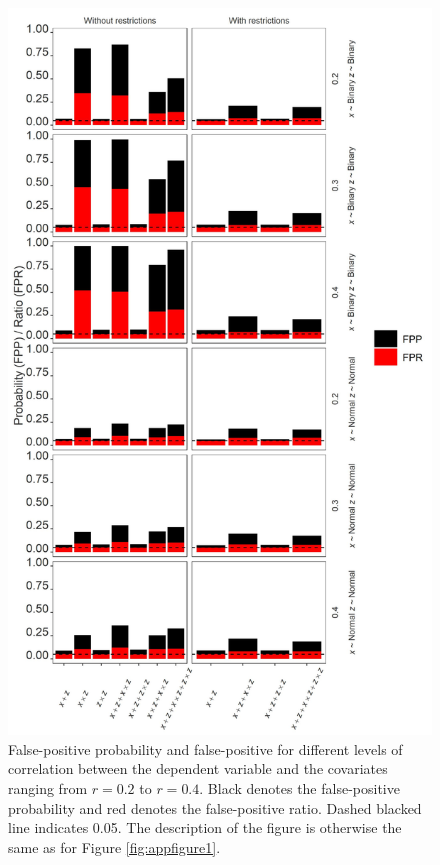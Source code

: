 \begin{landscape}
\begin{figure}[ht!]
\includegraphics[scale=0.65]{R/Analysis/Result/Figures/Figure2SI.jpeg}
\centering
\caption{False-positive probability and false-positive for different levels of correlation between the dependent variable and the covariates ranging from  $\textit{r}=0.2$ to  $\textit{r}=0.4$. Black denotes the false-positive probability and red denotes the false-positive ratio. Dashed blacked line indicates 0.05. The description of the figure is otherwise the same as for Figure \ref{fig:appfigure1}.}
\label{fig:appfigure2}
\end{figure}
\end{landscape}


